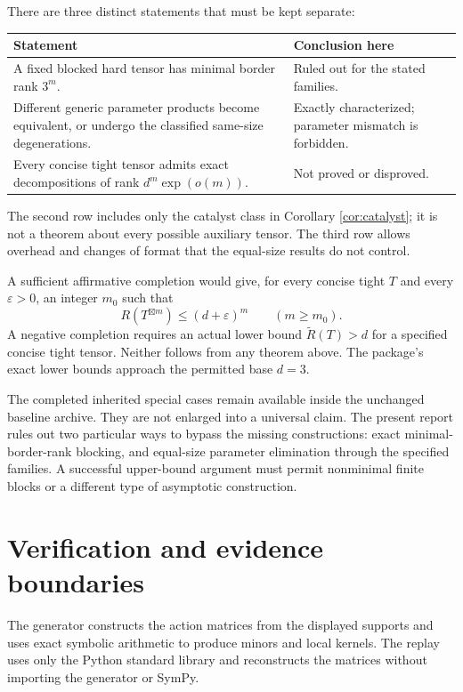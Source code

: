 \documentclass[11pt]{article}
\theoremstyle{remark}\newtheorem{remark}[theorem]{Remark}
\newcommand{\AR}{\widetilde R}
\newcommand{\gp}{\boxtimes}
\begin{document}
There are three distinct statements that must be kept separate:
\begin{center}
\begin{tabular}{p{}p{}}
\toprule
Statement & Conclusion here\\
\midrule
A fixed blocked hard tensor has minimal border rank $3^m$. & Ruled out for the stated families.\\[3pt]
Different generic parameter products become equivalent, or undergo the classified same-size degenerations. & Exactly characterized; parameter mismatch is forbidden.\\[3pt]
Every concise tight tensor admits exact decompositions of rank $d^m\exp(o(m))$. & Not proved or disproved.\\
\bottomrule
\end{tabular}
\end{center}
The second row includes only the catalyst class in Corollary \ref{cor:catalyst}; it is not a theorem about every possible auxiliary tensor. The third row allows overhead and changes of format that the equal-size results do not control.

A sufficient affirmative completion would give, for every concise tight $T$ and every $\varepsilon>0$, an integer $m_0$ such that
\[
 R(T^{\gp m})\leq(d+\varepsilon)^m\qquad(m\geq m_0).
\]
A negative completion requires an actual lower bound $\AR(T)>d$ for a specified concise tight tensor. Neither follows from any theorem above. The package's exact lower bounds approach the permitted base $d=3$.

The completed inherited special cases remain available inside the unchanged baseline archive. They are not enlarged into a universal claim. The present report rules out two particular ways to bypass the missing constructions: exact minimal-border-rank blocking, and equal-size parameter elimination through the specified families. A successful upper-bound argument must permit nonminimal finite blocks or a different type of asymptotic construction.

\section{Verification and evidence boundaries}\label{sec:verification}
The generator constructs the action matrices from the displayed supports and uses exact symbolic arithmetic to produce minors and local kernels. The replay uses only the Python standard library and reconstructs the matrices without importing the generator or SymPy.
\end{document}
